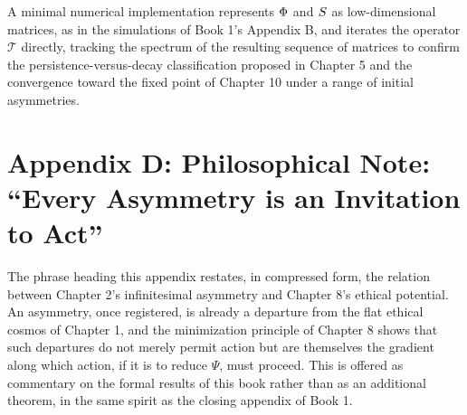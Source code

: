 A minimal numerical implementation represents $\Phi$ and $S$ as low-dimensional matrices, as in the simulations of Book 1's Appendix B, and iterates the operator $\mathcal{T}$ directly, tracking the spectrum of the resulting sequence of matrices to confirm the persistence-versus-decay classification proposed in Chapter 5 and the convergence toward the fixed point of Chapter 10 under a range of initial asymmetries.

\chapter*{Appendix D: Philosophical Note: ``Every Asymmetry is an Invitation to Act''}

The phrase heading this appendix restates, in compressed form, the relation between Chapter 2's infinitesimal asymmetry and Chapter 8's ethical potential. An asymmetry, once registered, is already a departure from the flat ethical cosmos of Chapter 1, and the minimization principle of Chapter 8 shows that such departures do not merely permit action but are themselves the gradient along which action, if it is to reduce $\Psi$, must proceed. This is offered as commentary on the formal results of this book rather than as an additional theorem, in the same spirit as the closing appendix of Book 1.

